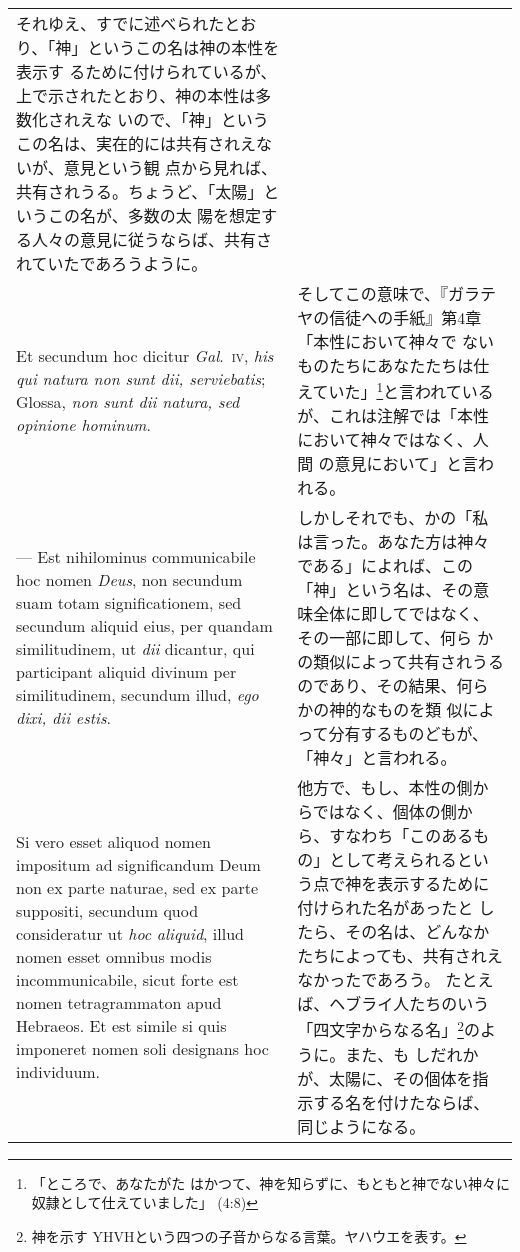\documentclass[10pt]{jsarticle}
\begin{document}
\begin{longtable}{p{21em}p{21em}}
それゆえ、すでに述べられたとおり、「神」というこの名は神の本性を表示す
るために付けられているが、上で示されたとおり、神の本性は多数化されえな
いので、「神」というこの名は、実在的には共有されえないが、意見という観
点から見れば、共有されうる。ちょうど、「太陽」というこの名が、多数の太
陽を想定する人々の意見に従うならば、共有されていたであろうように。

\\

Et secundum hoc dicitur {\itshape Gal}.~{\scshape iv}, {\itshape his
qui natura non sunt dii, serviebatis}; Glossa, {\itshape non sunt dii
natura, sed opinione hominum}.

&

そしてこの意味で、『ガラテヤの信徒への手紙』第4章「本性において神々で
ないものたちにあなたたちは仕えていた」\footnote{「ところで、あなたがた
はかつて、神を知らずに、もともと神でない神々に奴隷として仕えていました」
(4:8)}と言われているが、これは注解では「本性において神々ではなく、人間
の意見において」と言われる。

\\

--- Est nihilominus communicabile hoc nomen {\itshape Deus}, non
secundum suam totam significationem, sed secundum aliquid eius, per
quandam similitudinem, ut {\itshape dii} dicantur, qui participant
aliquid divinum per similitudinem, secundum illud, {\itshape ego dixi,
dii estis}.

&

しかしそれでも、かの「私は言った。あなた方は神々である」によれば、この
「神」という名は、その意味全体に即してではなく、その一部に即して、何ら
かの類似によって共有されうるのであり、その結果、何らかの神的なものを類
似によって分有するものどもが、「神々」と言われる。

\\

Si vero esset aliquod nomen impositum ad significandum Deum non ex
parte naturae, sed ex parte suppositi, secundum quod consideratur ut
{\itshape hoc aliquid}, illud nomen esset omnibus modis
incommunicabile, sicut forte est nomen tetragrammaton apud
Hebraeos. Et est simile si quis imponeret nomen soli designans hoc
individuum.

&

他方で、もし、本性の側からではなく、個体の側から、すなわち「このあるも
の」として考えられるという点で神を表示するために付けられた名があったと
したら、その名は、どんなかたちによっても、共有されえなかったであろう。
たとえば、ヘブライ人たちのいう「四文字からなる名」\footnote{神を示す
YHVHという四つの子音からなる言葉。ヤハウエを表す。}のように。また、も
しだれかが、太陽に、その個体を指示する名を付けたならば、同じようになる。


\end{longtable}
\end{document}
